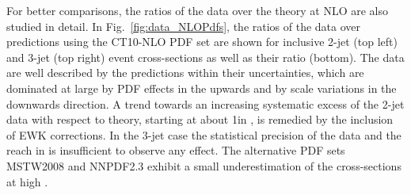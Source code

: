 For better comparisons, the ratios of the data over the theory at NLO are also studied in detail. In Fig.~\ref{fig:data_NLOPdfs}, the ratios of the data over \NLOJETPP predictions using the CT10-NLO PDF set are shown for inclusive 2-jet (top left) and 3-jet (top right) event cross-sections as well as their ratio \ratio (bottom). The data are well described by the predictions within their uncertainties, which are dominated at large \httwo by PDF effects in the upwards and by scale variations in the downwards direction. A trend towards an increasing systematic excess of the 2-jet data with respect to theory, starting at about 1\TeV in \httwo, is remedied by the inclusion of EWK corrections. In the 3-jet case the statistical precision of the data and the reach in \httwo is insufficient to observe any effect. The alternative PDF sets MSTW2008 and NNPDF2.3 exhibit a small underestimation of the cross-sections at high \httwo.

